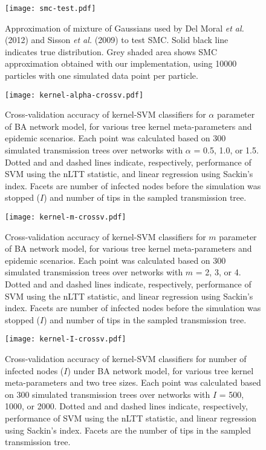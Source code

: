 \documentclass[12pt]{article}\usepackage[]{graphicx}\usepackage[]{color}
\begin{document}
\begin{figure}[ht]
  \centering
  \texttt{[image: smc-test.pdf]}
  \caption{Approximation of mixture of Gaussians used by
    Del Moral \textit{et al.} (2012) and Sisson \textit{et al.} (2009) to test
    SMC. Solid black line indicates true distribution. Grey shaded area shows
    SMC approximation obtained with our implementation, using 10000
    particles with one simulated data point per particle.
  }
  \label{fig:smctest}
\end{figure}

\begin{figure}[ht]
  \centering
  \texttt{[image: kernel-alpha-crossv.pdf]}
  \caption{
    Cross-validation accuracy of kernel-SVM classifiers for $\alpha$ parameter
    of BA network model, for various tree kernel meta-parameters and
    epidemic scenarios. Each point was calculated based on 300 simulated
    transmission trees over networks with $\alpha$ = 0.5, 1.0, or 1.5. Dotted
    and and dashed lines indicate, respectively, performance of SVM using the
    nLTT statistic, and linear regression using Sackin's index. Facets
    are number of infected nodes before the simulation was stopped ($I$) and
    number of tips in the sampled transmission tree.
  }
  \label{fig:alphacrossv}
\end{figure}

\begin{figure}[ht]
  \centering
  \texttt{[image: kernel-m-crossv.pdf]}
  \caption{Cross-validation accuracy of kernel-SVM classifiers for $m$
      parameter of BA network model, for various tree kernel
      meta-parameters and epidemic scenarios. Each point was calculated based
      on 300 simulated transmission trees over networks with $m$ = 2, 3, or 4.
      Dotted and and dashed lines indicate, respectively, performance of SVM
      using the nLTT statistic, and linear regression using Sackin's
      index. Facets are number of infected nodes before the simulation was
      stopped ($I$) and number of tips in the sampled transmission tree.
  }
  \label{fig:mcrossv}
\end{figure}

\begin{figure}[ht]
  \centering
  \texttt{[image: kernel-I-crossv.pdf]}
  \caption{Cross-validation accuracy of kernel-SVM classifiers for number of
      infected nodes ($I$) under BA network model, for various tree
      kernel meta-parameters and two tree sizes. Each point was calculated
      based on 300 simulated transmission trees over networks with $I$ = 500,
      1000, or 2000. Dotted and and dashed lines indicate, respectively,
      performance of SVM using the nLTT statistic, and linear regression
      using Sackin's index. Facets are the number of tips in the sampled
      transmission tree.
  }
  \label{fig:Icrossv}
\end{figure}
\end{document}
